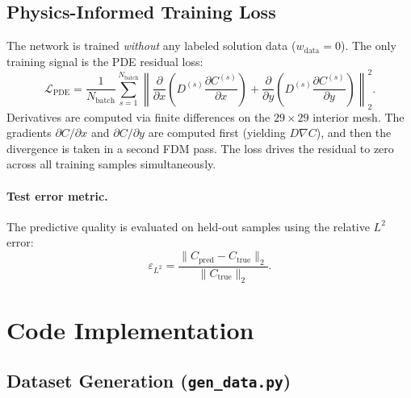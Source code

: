 \documentclass[11pt]{article}
\begin{document}
\subsection{Physics-Informed Training Loss}

The network is trained \emph{without} any labeled solution data
($w_\text{data} = 0$).  The only training signal is the PDE residual loss:
\begin{equation}
  \mathcal{L}_\text{PDE}
  = \frac{1}{N_\text{batch}} \sum_{s=1}^{N_\text{batch}}
    \left\|
      \frac{\partial}{\partial x}\!\left(D^{(s)}\frac{\partial C^{(s)}}{\partial x}\right)
      +
      \frac{\partial}{\partial y}\!\left(D^{(s)}\frac{\partial C^{(s)}}{\partial y}\right)
    \right\|_2^2.
\end{equation}
Derivatives are computed via finite differences on the $29\times29$ interior
mesh.  The gradients $\partial C/\partial x$ and $\partial C/\partial y$ are
computed first (yielding $D\nabla C$), and then the divergence is taken in a
second FDM pass.  The loss drives the residual to zero across all training
samples simultaneously.

\paragraph{Test error metric.}
The predictive quality is evaluated on held-out samples using the relative
$L^2$ error:
\begin{equation}
  \varepsilon_{L^2}
  = \frac{\bigl\| C_\text{pred} - C_\text{true} \bigr\|_2}
         {\bigl\| C_\text{true} \bigr\|_2}.
\end{equation}

\section{Code Implementation}

\subsection{Dataset Generation (\texttt{gen\_data.py})}
\end{document}
